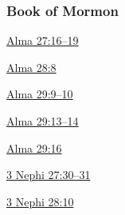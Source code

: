 						
						
						
						
		
	\subsubsection{Book of Mormon} %
		\label{JOY-BOM}
	
		
		\begin{compactdesc}
			\item[{\hyperref[ALMA-27-16]{Alma 27:16--19}}]
			\item[{\hyperref[ALMA-28-8]{Alma 28:8}}]
			\item[{\hyperref[ALMA-29-9]{Alma 29:9--10}}]
			\item[{\hyperref[ALMA-29-13]{Alma 29:13--14}}]
			\item[{\hyperref[ALMA-29-16]{Alma 29:16}}]
			\item[{\hyperref[3NEPHI-27-30]{3 Nephi 27:30--31}}]
			\item[{\hyperref[3NEPHI-28-10]{3 Nephi 28:10}}]
		\end{compactdesc}
		
